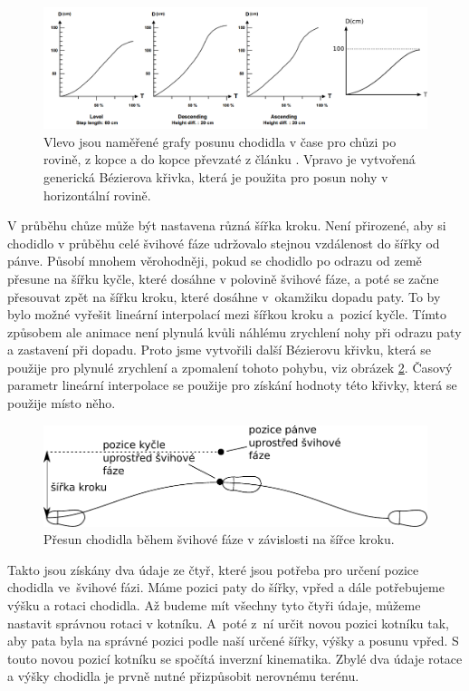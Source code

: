\begin{figure}[h]
	\centering
	\includegraphics[width=1.0\linewidth]{fig/leg_swing_speed.pdf}
	\caption{Vlevo jsou naměřené grafy posunu chodidla v čase pro chůzi po rovině, z kopce a do kopce převzaté z článku \cite{chung}. Vpravo je vytvořená generická Bézierova křivka, která je použita pro posun nohy v horizontální rovině.}
	\label{fig:swingSpeed}
\end{figure}

V průběhu chůze může být nastavena různá šířka kroku. Není přirozené, aby si chodidlo v průběhu celé švihové fáze udržovalo stejnou vzdálenost do šířky od pánve. Působí mnohem věrohodněji, pokud se chodidlo po odrazu od země přesune na šířku kyčle, které dosáhne v polovině švihové fáze, a poté se začne přesouvat zpět na šířku kroku, které dosáhne v~okamžiku dopadu paty. To by bylo možné vyřešit lineární interpolací mezi šířkou kroku a~pozicí kyčle. Tímto způsobem ale animace není plynulá kvůli náhlému zrychlení nohy při odrazu paty a zastavení při dopadu. Proto jsme vytvořili další Bézierovu křivku, která se použije pro plynulé zrychlení a zpomalení tohoto pohybu, viz obrázek \ref{fig:widthStep}. Časový parametr lineární interpolace se použije pro získání hodnoty této křivky, která se použije místo něho.

\begin{figure}[h]
	\centering
	\includegraphics[width=0.7\linewidth]{fig/svih_sirka_kroku.pdf}
	\caption{Přesun chodidla během švihové fáze v závislosti na šířce kroku.}
	\label{fig:widthStep}
\end{figure}

Takto jsou získány dva údaje ze čtyř, které jsou potřeba pro určení pozice chodidla ve~švihové fázi. Máme pozici paty do šířky, vpřed a dále potřebujeme výšku a rotaci chodidla. Až budeme mít všechny tyto čtyři údaje, můžeme nastavit správnou rotaci v kotníku. A~poté z~ní určit novou pozici kotníku tak, aby pata byla na správné pozici podle naší určené šířky, výšky a posunu vpřed. S touto novou pozicí kotníku se spočítá inverzní kinematika. Zbylé dva údaje rotace a výšky chodidla je prvně nutné přizpůsobit nerovnému terénu.

